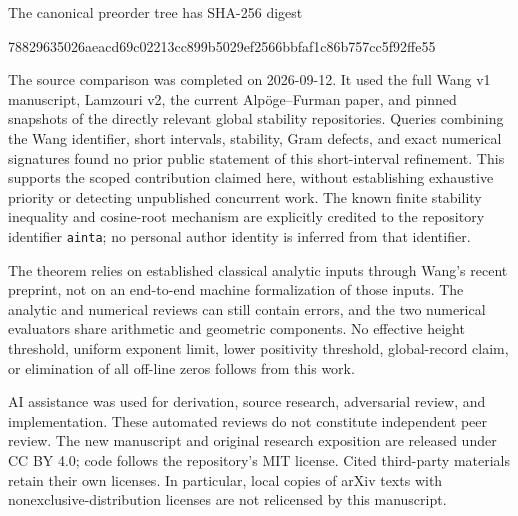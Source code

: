 \documentclass[11pt]{article}
\theoremstyle{remark}
\begin{document}
The canonical preorder tree has SHA-256 digest
\begin{center}\small\ttfamily
78829635026aeacd69c02213cc899b5029ef2566bbfaf1c86b757cc5f92ffe55
\end{center}

The source comparison was completed on 2026-09-12. It used the full
Wang v1 manuscript, Lamzouri v2, the current Alp\"oge--Furman paper,
and pinned snapshots of the directly relevant global stability
repositories. Queries combining the Wang identifier, short intervals,
stability, Gram defects, and exact numerical signatures found no prior
public statement of this short-interval refinement. This supports the
scoped contribution claimed here, without establishing exhaustive
priority or detecting unpublished concurrent work. The known finite
stability inequality and cosine-root mechanism are explicitly credited
to the repository identifier \texttt{ainta}; no personal author identity
is inferred from that identifier.

The theorem relies on established classical analytic inputs through
Wang's recent preprint, not on an end-to-end machine formalization of
those inputs. The analytic and numerical reviews can still contain
errors, and the two numerical evaluators share arithmetic and geometric
components. No effective height threshold, uniform exponent limit,
lower positivity threshold, global-record claim, or elimination of all
off-line zeros follows from this work.

AI assistance was used for derivation, source research, adversarial
review, and implementation. These automated reviews do not constitute
independent peer review. The new manuscript and original research
exposition are released under CC BY 4.0; code follows the repository's
MIT license. Cited third-party materials
retain their own licenses. In particular, local copies of arXiv texts
with nonexclusive-distribution licenses are not relicensed by this
manuscript.
\end{document}

